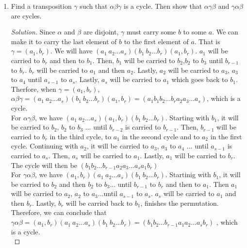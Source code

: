 \documentclass[12pt]{article}
\renewcommand\qedsymbol{$\blacksquare$}
\newenvironment{solution}
{\begin{proof}[Solution]\renewcommand\qedsymbol{$\square$}}
 {\end{proof}}
\begin{document}
\begin{enumerate}
\begin{enumerate}[label=(\alph*)]
\begin{proof}
                \end{proof}
                \item Find a transposition $\gamma$ such that $\alpha \beta \gamma$ is a cycle. Then show that $\alpha \gamma \beta$ and $\gamma \alpha \beta$ are cycles.
                \begin{solution}
                    Since $\alpha$ and $\beta$ are disjoint, $\gamma$ must carry some $b$ to some $a$. We can make it to carry the last element of $b$ 
                    to the first element of $a$. That is $\gamma = (a_1,b_r)$. We will have $(a_1\ a_2...a_s)(b_1\ b_2...b_r)(a_1,b_r) $. $a_1$ will be carried to $b_r$ and then to $b_1$. Then, $b_1$ will be carried to $b_2$,$b_2$ to $b_3$ until $b_{r-1}$ to $b_r$. $b_r$ will be carried to $a_1$ and then $a_2$. Lastly, $a_2$ will be carried to $a_3$, $a_3$ to $a_4$ until $a_{s-1}$ to $a_s$. Lastly, $a_s$ will be carried to $a_1$ which goes back to $b_1$. Therfore, when $\gamma = (a_1,b_r)$, $\alpha \beta \gamma = (a_1\ a_2...a_s)(b_1\ b_2...b_r)(a_1,b_r) = (a_1b_1b_2...b_ra_2a_3...a_s)$, which is a cycle.\\
                    \newline
             		For $\alpha \gamma \beta$, we have $(a_1\ a_2...a_s)(a_1,b_r)(b_1\ b_2...b_r)$. 
                    Starting with $b_1$, it will be carried to $b_2$,
                    $b_2$ to $b_3$ ... until $b_{r-2}$ is carried to $b_{r-1}$. Then, $b_{r-1}$ will be carried to $b_r$ in the third cycle, to $a_1$ in the second cycle and to $a_2$ in the first cycle. 
                    Continuing with $a_2$, it will be carried to $a_3$,
                    $a_3$ to $a_4$ ... until $a_{s-1}$ is carried to $a_s$. Then, $a_s$ will be carried to $a_1$. Lastly, $a_1$ will be carried to $b_r$. The cycle will then be $(b_1b_2...b_{r-1}a_2a_3...a_sa_1b_r)$\\
               
               		For $\gamma\alpha  \beta$, we have $(a_1,b_r) (a_1\ a_2...a_s) (b_1\ b_2...b_r)$. Startinig with $b_1$, it will be carried to $b_2$ and then $b_2$ to $b_3$... until $b_{r-1}$ to $b_r$ and then to $a_1$. Then $a_1$ will be carried to $a_2$, $a_2$ to $a_3$...until $a_{s-1}$ to $a_{s}$. $a_{s}$ will be carried to $a_1$ and then $b_r$. Lastly, $b_r$ will be carried back to $b_1$, finishes the permutation. Therefore, we can conclude that $\gamma\alpha  \beta = (a_1,b_r) (a_1\ a_2...a_s) (b_1\ b_2...b_r)= (b_1b_2...b_{r-1}a_1a_2...a_sb_r)$ , which is a cycle.\\
                \end{solution}
            \end{enumerate}


\end{enumerate}
\end{document}
